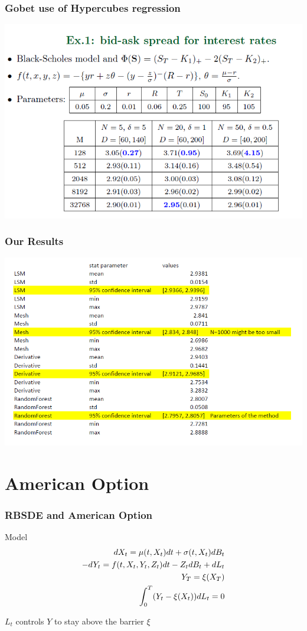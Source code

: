 \documentclass[10pt]{beamer}
\begin{document}
\begin{frame}
	\frametitle{Gobet use of Hypercubes regression}
	

	\centering
	\includegraphics[scale = 0.4]{gobet_results.png} 
	
\end{frame}

\begin{frame}
	\frametitle{Our Results}
	
	
	\centering
	\includegraphics[scale = 0.4]{our_results.png} 
	
\end{frame}

\section{American Option}

\begin{frame}
	\frametitle{RBSDE and American Option}
	\begin{block}{Model}
		\begin{eqnarray}
		dX_t = \mu(t,X_t)dt + \sigma (t, X_t) dB_t\notag\\
		-dY_t = f(t,X_t, Y_t, Z_t)dt - Z_tdB_t +dL_t\notag\\
		Y_T=\xi (X_T) \notag \\
		\int_{0}^{T}(Y_t - \xi(X_t))dL_t = 0\notag
		\end{eqnarray}
	\end{block}
	
	$L_t$ controls $Y$ to stay above the barrier $\xi$
\end{frame}
\end{document}
